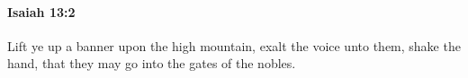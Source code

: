 
		\paragraph{Isaiah 13:2} %
			\label{ISAIAH-13-2}

			Lift ye up a banner upon the high mountain, exalt the voice unto them, shake the hand, that they may go into the gates of the nobles.


